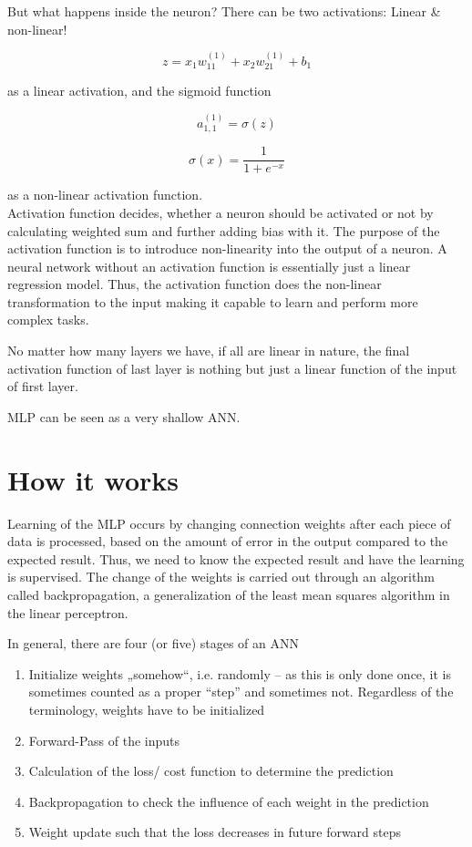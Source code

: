 But what happens inside the neuron? There can be two activations: Linear \& non-linear!

$$ z = x_{1}w_{11}^{(1)} + x_{2}w_{21}^{(1)} + b_{1}$$

as a linear activation, and the sigmoid function


$$ a_{1,1}^{(1)} = \sigma(z) $$

$$ \sigma(x) = \frac{1}{1 + e^{-x}} $$

as a non-linear activation function. \\

Activation function decides, whether a neuron should be activated or not by calculating weighted sum and further adding bias with it. The purpose of the activation function is to introduce non-linearity into the output of a neuron. A neural network without an activation function is essentially just a linear regression model. Thus, the activation function does the non-linear transformation to the input making it capable to learn and perform more complex tasks.

No matter how many layers we have, if all are linear in nature, the final activation function of last layer is nothing but just a linear function of the input of first layer.

MLP can be seen as a very shallow ANN.
%
%
\section{How it works}	
%
%
Learning of the MLP occurs by changing connection weights after each piece of data is processed, based on the amount of error in the output compared to the expected result. Thus, we need to know the expected result and have the learning is supervised. The change of the weights is carried out through an algorithm called backpropagation, a generalization of the least mean squares algorithm in the linear perceptron.


In general, there are four (or five) stages of an ANN

\begin{enumerate}
	\item Initialize weights „somehow“, i.e. randomly – as this is only done once, it is sometimes counted as a proper “step” and sometimes not. Regardless of the terminology, weights have to be initialized
	\item Forward-Pass of the inputs
	\item Calculation of the loss/ cost function to determine the prediction
	\item Backpropagation to check the influence of each weight in the prediction
	\item Weight update such that the loss decreases in future forward steps
\end{enumerate}
%
%
